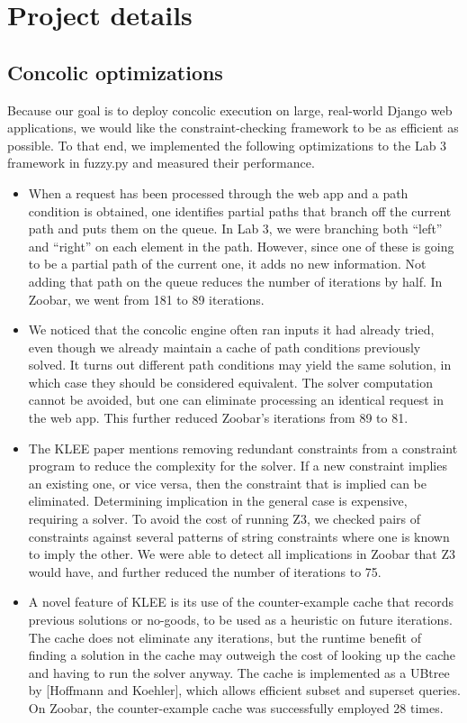 \documentclass{scrartcl}
\begin{document}
\section{Project details}

\subsection{Concolic optimizations}
Because our goal is to deploy concolic execution on large, real-world
Django web applications, we would like the constraint-checking framework
to be as efficient as possible. To that end, we implemented the
following optimizations to the Lab 3 framework in fuzzy.py and measured
their performance.

\begin{itemize}
\item When a request has been processed through the web app and a path
condition is obtained, one identifies partial paths that branch off the
current path and puts them on the queue. In Lab 3, we were branching
both ``left'' and ``right'' on each element in the path. However, since
one of these is going to be a partial path of the current one, it adds
no new information. Not adding that path on the queue reduces the number
of iterations by half. In Zoobar, we went from 181 to 89 iterations.

\item We noticed that the concolic engine often ran inputs it had
already tried, even though we already maintain a cache of path
conditions previously solved. It turns out different path conditions
may yield the same solution, in which case they should be considered
equivalent. The solver computation cannot be avoided, but one can
eliminate processing an identical request in the web app. This further
reduced Zoobar's iterations from 89 to 81.

\item The KLEE paper mentions removing redundant constraints from a
constraint program to reduce the complexity for the solver. If a new
constraint implies an existing one, or vice versa, then the constraint
that is implied can be eliminated.
Determining implication in the general case is expensive, requiring a
solver. To avoid the cost of running Z3, we checked pairs of constraints
against several patterns of string constraints where one is known to
imply the other. We were able to detect all implications in Zoobar that
Z3 would have, and further reduced the number of iterations to 75.

\item A novel feature of KLEE is its use of the counter-example cache
that records previous solutions or no-goods, to be used as a heuristic
on future iterations. The cache does not eliminate any iterations, but
the runtime benefit of finding a solution in the cache may outweigh the
cost of looking up the cache and having to run the solver anyway.
The cache is implemented as a UBtree by [Hoffmann and Koehler],
which allows efficient subset and superset queries. On Zoobar, the
counter-example cache was successfully employed 28 times.
\end{itemize}
\end{document}

